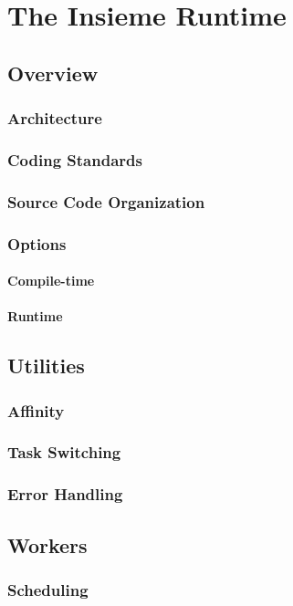 \chapter{The Insieme Runtime} \label{cap:runtime}

\section{Overview}
\subsection{Architecture}
\subsection{Coding Standards}
\subsection{Source Code Organization}
\subsection{Options}
\subsubsection{Compile-time}
\subsubsection{Runtime}

\section{Utilities}
\subsection{Affinity}
\subsection{Task Switching}
\subsection{Error Handling}
\section{Workers}
\subsection{Scheduling}
